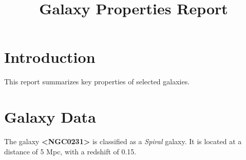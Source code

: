 \documentclass{article}
\title{Galaxy Properties Report}
\author{}
\date{}
\begin{document}
\maketitle

\section{Introduction}
This report summarizes key properties of selected galaxies.

\section{Galaxy Data}
The galaxy \textbf{<NGC0231>} is classified as a \textit{Spiral} galaxy. 
It is located at a distance of 5 Mpc, with a redshift of 0.15.
\end{document}
